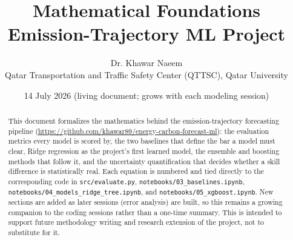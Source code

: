 \documentclass[11pt]{article}
\title{Mathematical Foundations \\ \large Emission-Trajectory ML Project}
\author{Dr. Khawar Naeem \\ Qatar Transportation and Traffic Safety Center (QTTSC), Qatar University}
\date{14 July 2026 (living document; grows with each modeling session)}
\begin{document}
\maketitle

\begin{abstract}
This document formalizes the mathematics behind the emission-trajectory
forecasting pipeline (\url{https://github.com/khawar89/energy-carbon-forecast-ml}):
the evaluation metrics every model is scored by, the two baselines that
define the bar a model must clear, Ridge regression as the project's first
learned model, the ensemble and boosting methods that follow it, and the
uncertainty quantification that decides whether a skill difference is
statistically real. Each
equation is numbered and tied directly to the corresponding code in
\texttt{src/evaluate.py}, \texttt{notebooks/03\_baselines.ipynb},
\texttt{notebooks/04\_models\_ridge\_tree.ipynb}, and
\texttt{notebooks/05\_xgboost.ipynb}. New sections are added as
later sessions (error analysis) are built, so this remains a
growing companion to the coding sessions rather than a one-time summary.
This is intended to support future methodology writing and research
extension of the project, not to substitute for it.
\end{abstract}

\tableofcontents











\end{document}
